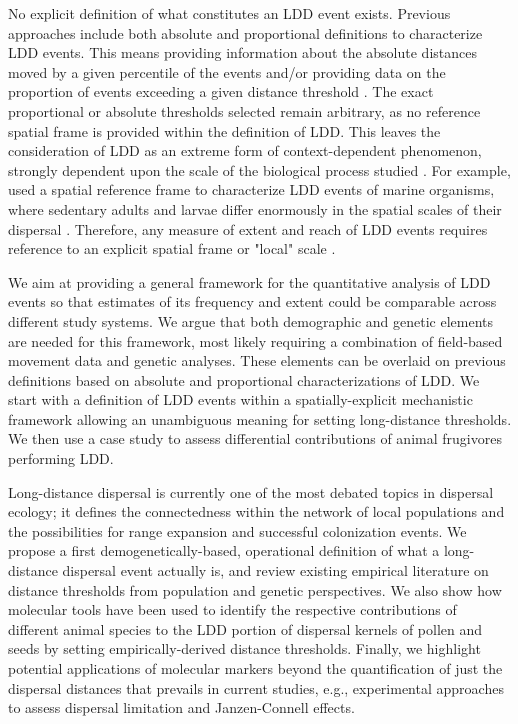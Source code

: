 \documentclass[a4paper, 12pt]{article}
\begin{document}
\begin{linenumbers}
No explicit definition of what constitutes an LDD event exists. Previous approaches \citep[e.g., ][]{Nathan:2006aa,schurr2009long} include both absolute and proportional definitions to characterize LDD events. This means providing information about the absolute distances moved by a given percentile of the events and/or providing data on the proportion of events exceeding a given distance threshold \citep{Nathan:2008is}. The exact proportional or absolute thresholds selected remain arbitrary, as no reference spatial frame is provided within the definition of LDD. This leaves the consideration of LDD as an extreme form of context-dependent phenomenon, strongly dependent upon the scale of the biological process studied \citep{Kinlan:2005fb}. For example, \cite{Kinlan:2005fb} used a spatial reference frame to characterize LDD events of marine organisms, where sedentary adults and larvae differ enormously in the spatial scales of their dispersal \citep{DAloia:2013fc}. Therefore, any measure of extent and reach of LDD events requires reference to an explicit spatial frame or "local" scale \citep{Kinlan:2005fb}.

We aim at providing a general framework for the quantitative analysis of LDD events so that estimates of its frequency and extent could be comparable across different study systems. We argue that both demographic and genetic elements are needed for this framework, most likely requiring a combination of field-based movement data and genetic analyses. These elements can be overlaid on previous definitions based on absolute and proportional characterizations of LDD. We start with a definition of LDD events within a spatially-explicit mechanistic framework allowing an unambiguous meaning for setting long-distance thresholds. We then use a case study to assess differential contributions of animal frugivores performing LDD.

Long-distance dispersal is currently one of the most debated topics in dispersal ecology; it defines the connectedness within the network of local populations and the possibilities for range expansion and successful colonization events. We propose a first demogenetically-based, operational definition of what a long-distance dispersal event actually is, and review existing empirical literature on distance thresholds from population and genetic perspectives. We also show how molecular tools have been used to identify the respective contributions of different animal species to the LDD portion of dispersal kernels of pollen and seeds by setting empirically-derived distance thresholds. Finally, we highlight potential applications of molecular markers beyond the quantification of just the dispersal distances that prevails in current studies, e.g., experimental approaches to assess dispersal limitation and Janzen-Connell effects.


\end{linenumbers}
\end{document}
